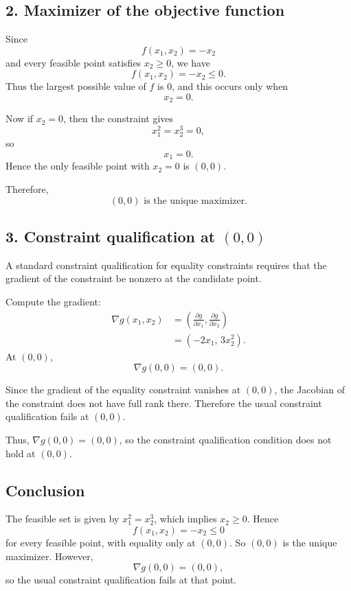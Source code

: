 \subsection*{2. Maximizer of the objective function}

Since
\[
f(x_1,x_2)=-x_2
\]
and every feasible point satisfies \(x_2\ge 0\), we have
\[
f(x_1,x_2)=-x_2\le 0.
\]
Thus the largest possible value of \(f\) is \(0\), and this occurs only when
\[
x_2=0.
\]

Now if \(x_2=0\), then the constraint gives
\[
x_1^2=x_2^3=0,
\]
so
\[
x_1=0.
\]
Hence the only feasible point with \(x_2=0\) is \((0,0)\).

Therefore,
\[
\boxed{(0,0) \text{ is the unique maximizer.}}
\]

\subsection*{3. Constraint qualification at \((0,0)\)}

A standard constraint qualification for equality constraints requires that the gradient of the constraint be nonzero at the candidate point.

Compute the gradient:
\[
\begin{aligned}
\nabla g(x_1,x_2)
&=
\left(
\frac{\partial g}{\partial x_1},
\frac{\partial g}{\partial x_2}
\right)\\
&=
(-2x_1,\,3x_2^2).
\end{aligned}
\]
At \((0,0)\),
\[
\nabla g(0,0)=(0,0).
\]

Since the gradient of the equality constraint vanishes at \((0,0)\), the Jacobian of the constraint does not have full rank there. Therefore the usual constraint qualification fails at \((0,0)\).

Thus,
$\nabla g(0,0)=(0,0)$, so the constraint qualification condition does not hold at $(0,0)$. 


\subsection*{Conclusion}

The feasible set is given by \(x_1^2=x_2^3\), which implies \(x_2\ge 0\). Hence
\[
f(x_1,x_2)=-x_2\le 0
\]
for every feasible point, with equality only at \((0,0)\). So \((0,0)\) is the unique maximizer. However,
\[
\nabla g(0,0)=(0,0),
\]
so the usual constraint qualification fails at that point.




